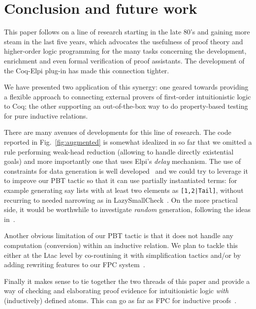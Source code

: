 \section{Conclusion and future work}

This paper follows on a line of research starting in the late 80's and
gaining more steam in the last five years, which advocates the
usefulness of proof theory and higher-order logic programming for the
many tasks concerning the development, enrichment and even formal
verification of proof assistants. The development of the Coq-Elpi
plug-in has made this connection tighter.

We have presented two application of this synergy: one geared towards
providing a flexible approach to connecting external provers of
first-order intuitionistic logic to Coq; the other supporting an out-of-the-box way to do property-based testing for pure inductive relations.
%


There are many avenues of developments for this line of research.
The code reported in Fig.~\ref{fig:augmented} is somewhat idealized in
so far that we omitted a rule performing weak-head reduction (allowing
to handle directly existential goals) and more importantly one that uses
 Elpi's \emph{delay} mechanism. %
The
use of constraints for data generation is well
developed~\cite{FioravantiPS15} and we could try to leverage it to
improve our PBT tactic so that it can use partially instantiated terms: for example generating
say lists with at least two elements as \texttt{[1,2|Tail]}, without
recurring to needed narrowing as in 
LazySmallCheck~\cite{smallcheck}. On the more practical side, it would be worthwhile to investigate \emph{random} generation, following the ideas in~\cite{pltredexconstraintlogic,blanco19ppdp}.

Another obvious limitation of our PBT tactic is that it does not 
 handle any computation (conversion) within an inductive relation. We plan to tackle this either at the Ltac level by co-routining it with simplification tactics and/or by adding rewriting features to our FPC system~\cite{ChihaniM16}.

 Finally it makes sense to tie together the two threads of this paper
 and provide a way of checking and elaborating proof evidence for
 intuitionistic logic \emph{with} (inductively) defined atoms. This
 can go as far as FPC for inductive proofs~\cite{blanco15wof}.

